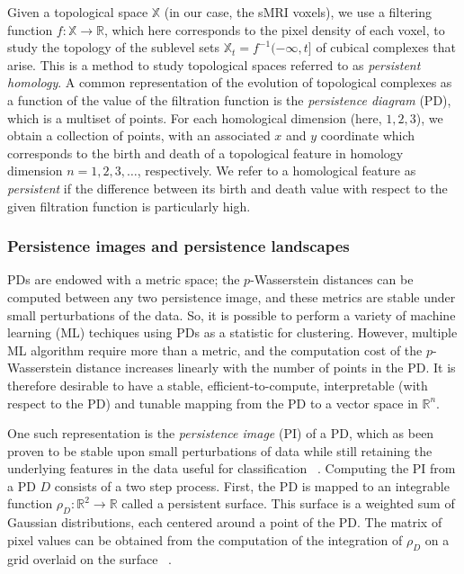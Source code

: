 \documentclass{article}
\begin{document}
Given a topological space $\mathbb{X}$ (in our case, the sMRI voxels), we use a filtering function $f:\mathbb{X}\to\mathbb{R}$, which here corresponds to the pixel density of each voxel, to study the topology of the sublevel sets $\mathbb{X}_t=f^{-1}(-\infty, t]$ of cubical complexes that arise. This is a method to study topological spaces referred to as \emph{persistent homology}. A common representation of the evolution of topological complexes as a function of the value of the filtration function is the \emph{persistence diagram} (PD), which is a multiset of points. For each homological dimension (here, $1,2,3$), we obtain a collection of points, with an associated $x$ and $y$ coordinate which corresponds to the birth and death of a topological feature in homology dimension $n=1,2,3,\ldots$, respectively. We refer to a homological feature as \emph{persistent} if the difference between its birth and death value with respect to the given filtration function is particularly high.


\subsubsection{Persistence images and persistence landscapes}\label{sec:theory_persistence_landscape_persistence_image}

PDs are endowed with a metric space; the $p$-Wasserstein distances can be computed between any two persistence image, and these metrics are stable under small perturbations of the data. So, it is possible to perform a variety of machine learning (ML) techiques using PDs as a statistic for clustering. However, multiple ML algorithm require more than a metric, and the computation cost of the $p$-Wasserstein distance increases linearly with the number of points in the PD. It is therefore desirable to have a stable, efficient-to-compute, interpretable (with respect to the PD) and tunable mapping from the PD to a vector space in $\mathbb{R}^n$.

One such representation is the \emph{persistence image} (PI) of a PD, which as been proven to be stable upon small perturbations of data while still retaining the underlying features in the data useful for classification ~\citep{adams2017persistence}. Computing the PI from a PD $D$ consists of a two step process. First, the PD is mapped to an integrable function $\rho_D : \mathbb{R}^2\to \mathbb{R}$ called a persistent surface. This surface is a weighted sum of Gaussian distributions, each centered around a point of the PD. The matrix of pixel values can be obtained from the computation of the integration of $\rho_D$ on a grid overlaid on the surface ~\citep{adams2017persistence}.
\end{document}
